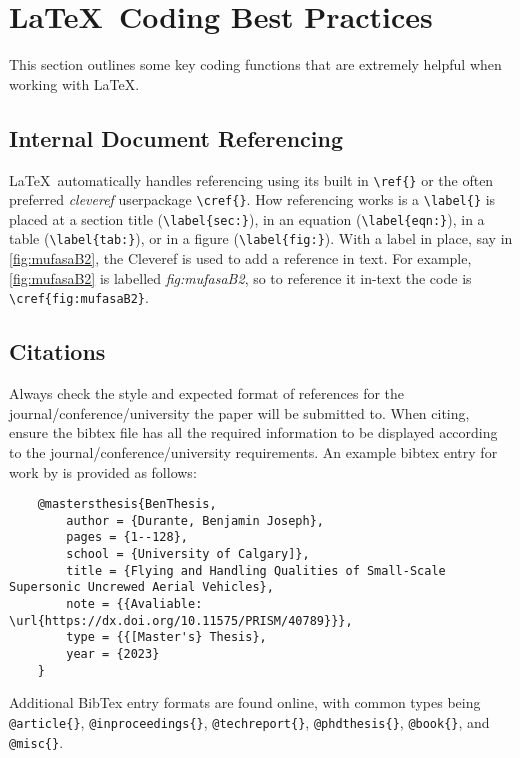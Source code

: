 \section{\LaTeX~Coding Best Practices} \label{sec:Conclusion}
This section outlines some key coding functions that are extremely helpful when working with \LaTeX.

\subsection{Internal Document Referencing}

\LaTeX\ automatically handles referencing using its built in \verb*|\ref{}| or the often preferred \textit{cleveref} userpackage \verb*|\cref{}|. 
How referencing works is a \verb*|\label{}| is placed at a section title (\verb*|\label{sec:}|), in an equation (\verb*|\label{eqn:}|), in a table (\verb*|\label{tab:}|), or in a figure (\verb*|\label{fig:}|). 
With a label in place, say in \cref{fig:mufasaB2}, the Cleveref is used to add a reference in text. For example, \cref{fig:mufasaB2} is labelled \textit{fig:mufasaB2}, so to reference it in-text the code is \verb*|\cref{fig:mufasaB2}|.

\subsection{Citations}

Always check the style and expected format of references for the journal/conference/university the paper will be submitted to. 
When citing, ensure the bibtex file has all the required information to be displayed according to the journal/conference/university requirements. 
An example bibtex entry for work by \citeauthor{BenThesis} \cite{BenThesis} is provided as follows: 

\begin{verbatim}
	@mastersthesis{BenThesis,
		author = {Durante, Benjamin Joseph},
		pages = {1--128},
		school = {University of Calgary]},
		title = {Flying and Handling Qualities of Small-Scale Supersonic Uncrewed Aerial Vehicles},
		note = {{Avaliable: \url{https://dx.doi.org/10.11575/PRISM/40789}}},
		type = {{[Master's} Thesis},
		year = {2023}
	}
\end{verbatim}

\noindent
Additional BibTex entry formats are found online, with common types being \verb*|@article{}|, \verb*|@inproceedings{}|, \verb*|@techreport{}|, \verb*|@phdthesis{}|, \verb*|@book{}|, and \verb*|@misc{}|. 
 
